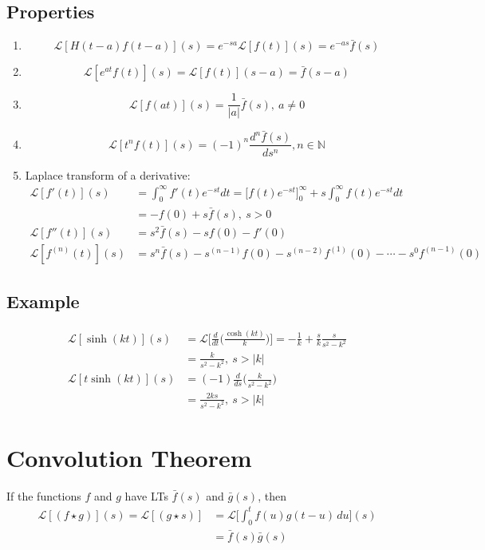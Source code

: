 \documentclass[a4paper, 11pt, normalem]{report}
\newcommand\ofnt{\int_{0}^{\infty}}
\newcommand\La{\mathcal{L}}
\begin{document}
\subsection{Properties}
\begin{enumerate}
    \item   \begin{equation*}
                \La[H(t - a)f(t - a)](s) = e^{-sa}\La[f(t)](s) = e^{-as}\bar{f}(s)
            \end{equation*}
    \item   \begin{equation*}
                \La[e^{at}f(t)](s) = \La[f(t)](s - a) = \bar{f}(s - a)
            \end{equation*}
    \item   \begin{equation*}
                \La[f(at)](s) = \frac{1}{|a|} \bar{f}(s),~ a \neq 0
            \end{equation*}
    \item   \begin{equation*}
                \La[t^n f(t)](s) = (-1)^n \frac{d^n \bar{f}(s)}{ds^n}, n \in \mathbb{N}
            \end{equation*}
    \item Laplace transform of a derivative:
            \begin{align*}
                \La[f'(t)](s) &= \ofnt f'(t)e^{-st}dt = \Big[f(t)e^{-st}\Big]_{0}^{\infty} + s \ofnt f(t)e^{-st}dt \\
                &= -f(0) + s\bar{f}(s),~ s > 0 \\
                \La[f''(t)](s) &= s^2\bar{f}(s) - sf(0) - f'(0) \\
                \La[f^{(n)}(t)](s) &= s^n \bar{f}(s) - s^{(n - 1)}f(0) - s^{(n - 2)}f^{(1)}(0) - \cdots - s^0 f^{(n - 1)}(0)
            \end{align*}
\end{enumerate}

\subsection{Example}
\begin{align*}
    \La[\sinh(kt)](s) &= \La\bigg[\frac{d}{dt}\Big(\frac{\cosh(kt)}{k}\Big)\bigg] = -\frac{1}{k} + \frac{s}{k} \frac{s}{s^2 - k^2} \\
    &= \frac{k}{s^2 - k^2},~ s > |k| \\
    \La[t\sinh(kt)](s) &= (-1)\frac{d}{ds}\Big(\frac{k}{s^2 - k^2}\Big) \\
    &= \frac{2ks}{s^2 - k^2},~ s > |k|
\end{align*}

\section{Convolution Theorem}
If the functions $f$ and $g$ have LTs $\bar{f}(s)$ and $\bar{g}(s)$, then
\begin{align*}
    \La[(f \star g)](s) = \La[(g \star s)] &= \La\Big[\int_{0}^{t} f(u)g(t - u)\,du \Big](s) \\
    &= \bar{f}(s)\bar{g}(s)
\end{align*}
\end{document}
